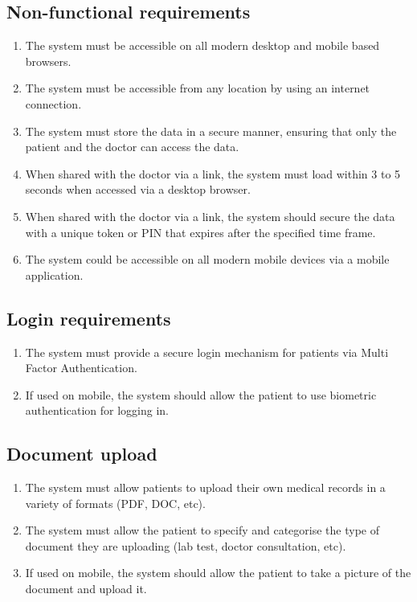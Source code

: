 \subsection{Non-functional requirements}
\begin{enumerate}
    \item The system must be accessible on all modern desktop and mobile based browsers.
    \item The system must be accessible from any location by using an internet connection.
    \item The system must store the data in a secure manner, ensuring that only the patient and the doctor can access the data.
    \item When shared with the doctor via a link, the system must load within 3 to 5 seconds when accessed via a desktop browser.
    \item When shared with the doctor via a link, the system should secure the data with a unique token or PIN that expires after the specified time frame.
    \item The system could be accessible on all modern mobile devices via a mobile application.
\end{enumerate}

\subsection{Login requirements}
\begin{enumerate}
    \item The system must provide a secure login mechanism for patients via Multi Factor Authentication.
    \item If used on mobile, the system should allow the patient to use biometric authentication for logging in.
\end{enumerate}

\subsection{Document upload}
\begin{enumerate}
    \item The system must allow patients to upload their own medical records in a variety of formats (PDF, DOC, etc).
    \item The system must allow the patient to specify and categorise the type of document they are uploading (lab test, doctor consultation, etc).
    \item If used on mobile, the system should allow the patient to take a picture of the document and upload it.
\end{enumerate}

